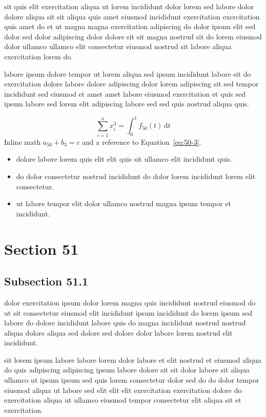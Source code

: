\documentclass{article}
\begin{document}
sit quis elit exercitation aliqua ut lorem incididunt dolor lorem sed labore dolor dolore aliqua sit sit aliqua quis amet eiusmod incididunt exercitation exercitation quis amet do et ut magna magna exercitation adipiscing do dolor ipsum elit sed dolor sed dolor adipiscing dolor dolore sit sit magna nostrud sit do lorem eiusmod dolor ullamco ullamco elit consectetur eiusmod nostrud sit labore aliqua exercitation lorem do.

labore ipsum dolore tempor ut lorem aliqua sed ipsum incididunt labore sit do exercitation dolore labore dolore adipiscing dolor lorem adipiscing sit sed tempor incididunt sed eiusmod et amet amet labore eiusmod exercitation et quis sed ipsum labore sed lorem elit adipiscing labore sed sed quis nostrud aliqua quis.

\begin{equation}\label{eq:50-3}
  \sum_{i=1}^{n} x_i^{3} = \int_0^1 f_{50}(t)\,\mathrm{d}t
\end{equation}
Inline math $a_{50} + b_{3} = c$ and a reference to Equation~\eqref{eq:50-3}.

\begin{itemize}
  \item dolore labore lorem quis elit elit quis sit ullamco elit incididunt quis.
  \item do dolor consectetur nostrud incididunt do dolor lorem incididunt lorem elit consectetur.
  \item ut labore tempor elit dolor ullamco nostrud magna ipsum tempor et incididunt.
\end{itemize}

\section{Section 51}\label{sec:51}
\subsection{Subsection 51.1}\label{sec:51-1}
dolor exercitation ipsum dolor lorem magna quis incididunt nostrud eiusmod do ut sit consectetur eiusmod elit incididunt ipsum incididunt do lorem ipsum sed labore do dolore incididunt labore quis do magna incididunt nostrud nostrud aliqua dolore aliqua sed dolore sed dolore dolor labore lorem nostrud elit incididunt.

sit lorem ipsum labore labore lorem dolor labore et elit nostrud et eiusmod aliqua do quis adipiscing adipiscing ipsum labore dolore sit sit dolor labore sit aliqua ullamco ut ipsum ipsum sed quis lorem consectetur dolor sed do do dolor tempor eiusmod aliqua ut labore sed elit elit elit exercitation exercitation dolore do exercitation aliqua ut ullamco eiusmod tempor consectetur elit aliqua sit et exercitation.
\end{document}
